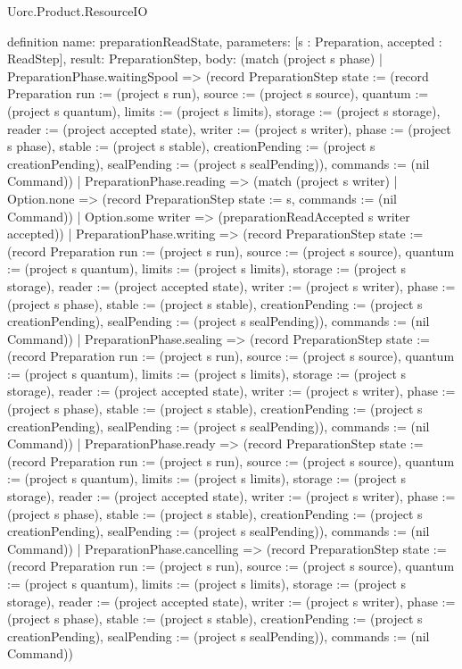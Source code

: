 \begin{lexlean}{Uorc.Product.ResourceIO}
\begin{semanticmodule}
definition{
  name: preparationReadState,
  parameters: [s : Preparation, accepted : ReadStep],
  result: PreparationStep,
  body: (match (project s phase)
    | PreparationPhase.waitingSpool => (record PreparationStep {state := (record Preparation {run := (project s run), source := (project s source), quantum := (project s quantum), limits := (project s limits), storage := (project s storage), reader := (project accepted state), writer := (project s writer), phase := (project s phase), stable := (project s stable), creationPending := (project s creationPending), sealPending := (project s sealPending)}), commands := (nil Command)})
    | PreparationPhase.reading => (match (project s writer)
      | Option.none => (record PreparationStep {state := s, commands := (nil Command)})
      | Option.some writer => (preparationReadAccepted s writer accepted))
    | PreparationPhase.writing => (record PreparationStep {state := (record Preparation {run := (project s run), source := (project s source), quantum := (project s quantum), limits := (project s limits), storage := (project s storage), reader := (project accepted state), writer := (project s writer), phase := (project s phase), stable := (project s stable), creationPending := (project s creationPending), sealPending := (project s sealPending)}), commands := (nil Command)})
    | PreparationPhase.sealing => (record PreparationStep {state := (record Preparation {run := (project s run), source := (project s source), quantum := (project s quantum), limits := (project s limits), storage := (project s storage), reader := (project accepted state), writer := (project s writer), phase := (project s phase), stable := (project s stable), creationPending := (project s creationPending), sealPending := (project s sealPending)}), commands := (nil Command)})
    | PreparationPhase.ready => (record PreparationStep {state := (record Preparation {run := (project s run), source := (project s source), quantum := (project s quantum), limits := (project s limits), storage := (project s storage), reader := (project accepted state), writer := (project s writer), phase := (project s phase), stable := (project s stable), creationPending := (project s creationPending), sealPending := (project s sealPending)}), commands := (nil Command)})
    | PreparationPhase.cancelling => (record PreparationStep {state := (record Preparation {run := (project s run), source := (project s source), quantum := (project s quantum), limits := (project s limits), storage := (project s storage), reader := (project accepted state), writer := (project s writer), phase := (project s phase), stable := (project s stable), creationPending := (project s creationPending), sealPending := (project s sealPending)}), commands := (nil Command)})
}
\end{semanticmodule}
\end{lexlean}
